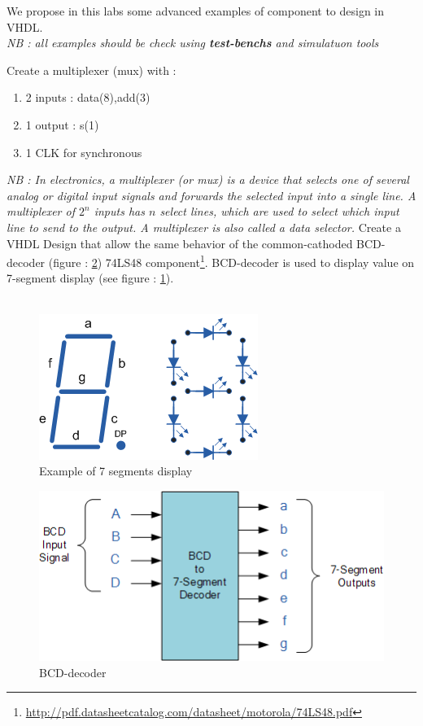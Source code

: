 \documentclass[12pt]{tdtp}
\begin{document}
\titre
We propose in this labs some advanced examples of component to design in VHDL.\\

\textit {NB : all examples should be check using \textbf{test-benchs} and simulatuon tools}


\Exo

Create a multiplexer (mux) with :

\begin{enumerate}
	\item 2 inputs : data(8),add(3)
	\item 1 output : s(1)
	\item 1 CLK for synchronous
\end{enumerate}

\textit{NB : In electronics, a multiplexer (or mux) is a device that selects one of several analog or digital input signals and forwards the selected input into a single line. A multiplexer of $2^n$ inputs has $n$ select lines, which are used to select which input line to send to the output. A multiplexer is also called a data selector.}
\newpage
\Exo
Create a VHDL Design that allow the same behavior of the common-cathoded BCD-decoder (figure : \ref{74HS48}) 74LS48 component\footnote{\url{http://pdf.datasheetcatalog.com/datasheet/motorola/74LS48.pdf}}. BCD-decoder is used to display value on 7-segment display (see figure : \ref{7seg}).\\
\\

\begin{figure}[h!]
\begin{center}
\includegraphics[scale=0.5]{images/7seg.png}
\caption{Example of 7 segments display}
\label{7seg}
\end{center}
\end{figure}


\begin{figure}[h!]
\begin{center}
\includegraphics[scale=0.5]{images/74LS48.png}
\caption{BCD-decoder}
\label{74HS48}
\end{center}
\end{figure}
\end{document}
